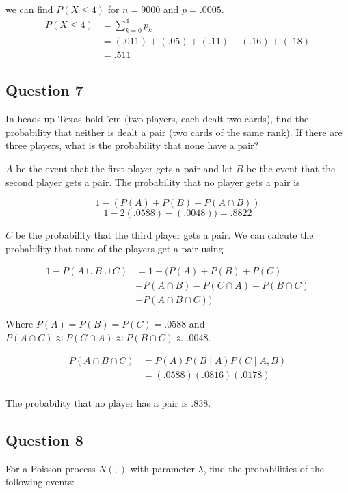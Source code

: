 \documentclass{tufte-book}
\theoremstyle{mytheoremstyle}
\theoremstyle{mylemstyle}
\theoremstyle{mydefstyle}
\begin{document}
 we can find $P(X\leq4)$ for $n=9000$ and $p=.0005$.
\begin{align*}
P(X\leq4) &= \sum_{k=0}^4p_k\\
&= (.011)+(.05)+(.11)+(.16)+(.18)\\
&= .511
\end{align*}

\subsection{Question 7}
In heads up Texas hold 'em (two players, each dealt two cards), find the probability that neither is dealt a pair (two cards of the same rank).  If there are three players, what is the probability that none have a pair?

 $A$ be the event that the first player gets a pair and let $B$ be the event that the second player gets a pair.  The probability that no player gets a pair is

\[1-(P(A) + P(B) - P(A\cap B))\]
\[1-2(.0588) - (.0048)) = .8822\]

 $C$ be the probability that the third player gets a pair.  We can calcute the probability that none of the players get a pair using

\begin{align*}
1 - P(A\cup B\cup C) &= 1 - (P(A) + P(B) + P(C)\\
&- P(A\cap B) - P(C\cap A) - P(B \cap C) \\
&+ P(A\cap B\cap C))
\end{align*}

Where $P(A) = P(B) = P(C) = .0588$ and $P(A\cap C) \approx P(C\cap A) \approx P(B \cap C)\approx .0048$.

\begin{align*}
P(A\cap B\cap C) &= P(A)P(B\mid A)P(C\mid A,B)\\
&=(.0588)(.0816)(.0178)\\
\end{align*}

The probability that no player has a pair is $.838$.


\subsection{Question 8}
For a Poisson process $N(,)$ with parameter $\lambda$, find the probabilities of the following events:
\end{document}
